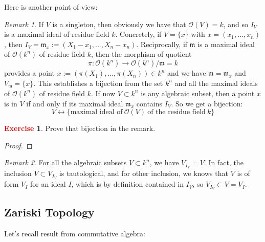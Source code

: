 \documentclass[12pt,a4paper,english]{article}
\theoremstyle{plain}
\theoremstyle{definition}
\newtheorem{exercise}{\textbf{\textcolor{red}{Exercise}}}
\theoremstyle{remark}
\newtheorem*{rem}{Remark}
\begin{document}
Here is another point of view:
\begin{rem}\label{rem2}
If $V$ is a singleton, then obviously we have that $\mathcal{O}(V)=k$, and so $I_{V}$ is a maximal ideal of residue field $k$. Concretely, if $V=\{x\}$ with $x=(x_{1},...,x_{n})$, then $I_{V}=\mathfrak{m}_{x}:=(X_{1}-x_{1},...,X_{n}-x_{n})$. Reciprocally, if $\mathfrak{m}$ is a maximal ideal of $\mathcal{O}(k^{n})$ of residue field $k$, then the morphism of quotient 
\begin{equation*}
    \pi: \mathcal{O}(k^{n})\rightarrow \mathcal{O}(k^{n})/\mathfrak{m}=k
\end{equation*}
provides a point $x:=(\pi(X_{1}),...,\pi(X_{n}))\in k^{n}$ and we have $\mathfrak{m}=\mathfrak{m}_{x}$ and $V_{\mathfrak{m}}=\{x\}$. This establishes a bijection from the set $k^{n}$ and all the maximal ideals of $\mathcal{O}(k^{n})$ of residue field $k$. If now $V\subset k^{n}$ is any algebraic subset, then a point $x$ is in $V$ if and only if its maximal ideal $\mathfrak{m}_{x}$ contains $I_{V}$. So we get a bijection:
\begin{equation*}
    V\leftrightarrow \{\text{maximal ideal of}\ \mathcal{O}(V)\ \text{of the residue field}\ k\}
\end{equation*}
\end{rem}
\begin{exercise}
Prove that bijection in the remark.
\end{exercise}
\begin{tcolorbox}
\begin{proof}

\end{proof}
\end{tcolorbox}
\begin{rem}
For all the algebraic subsets $V\subset k^{n}$, we have $V_{I_{V}}=V$. In fact, the inclusion $V\subset V_{I_{V}}$ is tautological, and for other inclusion, we knows that $V$ is of form $V_{I}$ for an ideal $I$, which is by definition contained in $I_{V}$, so $V_{I_{V}}\subset V=V_{I}$.
\end{rem}

\subsection{Zariski Topology}
Let's recall result from commutative algebra:
\end{document}
